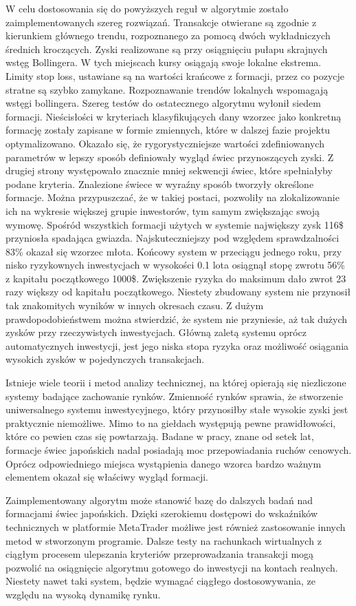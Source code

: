 \documentclass[pdflatex,11pt]{aghdpl}
\begin{document}
W celu dostosowania się do powyższych reguł w algorytmie zostało zaimplementowanych szereg rozwiązań. Transakcje otwierane są zgodnie z kierunkiem głównego trendu, rozpoznanego za pomocą dwóch wykładniczych średnich kroczących. Zyski realizowane są przy osiągnięciu pułapu skrajnych wstęg Bollingera. W tych miejscach kursy osiągają swoje lokalne ekstrema. Limity stop loss, ustawiane są na wartości krańcowe z formacji, przez co pozycje stratne są szybko zamykane. Rozpoznawanie trendów lokalnych wspomagają wstęgi bollingera. Szereg testów do ostatecznego algorytmu wyłonił siedem formacji. Nieścisłości w kryteriach klasyfikujących dany wzorzec jako konkretną formację zostały zapisane w formie zmiennych, które w dalszej fazie projektu optymalizowano. Okazało się, że rygorystyczniejsze wartości zdefiniowanych parametrów w lepszy sposób definiowały wygląd świec przynoszących zyski. Z drugiej strony występowało znacznie mniej sekwencji świec, które spełniałyby podane kryteria. Znalezione świece w wyraźny sposób tworzyły określone formacje. Można przypuszczać, że w takiej postaci, pozwoliły na zlokalizowanie ich na wykresie większej grupie inwestorów, tym samym zwiększając swoją wymowę. Spośród wszystkich formacji użytych w systemie największy zysk 116\$ przyniosła spadająca gwiazda. Najskuteczniejszy pod względem sprawdzalności 83\% okazał się wzorzec młota. Końcowy system w przeciągu jednego roku, przy nisko ryzykownych inwestycjach w wysokości 0.1 lota osiągnął stopę zwrotu 56\% z kapitału początkowego 1000\$. Zwiększenie ryzyka do maksimum dało zwrot 23 razy większy od kapitału początkowego. Niestety zbudowany system nie przynosił tak znakomitych wyników w innych okresach czasu. Z dużym prawdopodobieństwem można stwierdzić, że system nie przyniesie, aż tak dużych zysków przy rzeczywistych inwestycjach. Główną zaletą systemu oprócz automatycznych inwestycji, jest jego niska stopa ryzyka oraz możliwość osiągania wysokich zysków w pojedynczych transakcjach. 

Istnieje wiele teorii i metod analizy technicznej, na której opierają się niezliczone systemy badające zachowanie rynków. Zmienność rynków sprawia, że stworzenie uniwersalnego systemu inwestycyjnego, który przynosiłby stałe wysokie zyski jest praktycznie niemożliwe. Mimo to na giełdach występują pewne prawidłowości, które co pewien czas się powtarzają. Badane w pracy, znane od setek lat, formacje świec japońskich nadal posiadają moc przepowiadania ruchów cenowych. Oprócz odpowiedniego miejsca wystąpienia danego wzorca bardzo ważnym elementem okazał się właściwy wygląd formacji. 

Zaimplementowany algorytm może stanowić bazę do dalszych badań nad formacjami świec japońskich. Dzięki szerokiemu dostępowi do wskaźników technicznych w platformie MetaTrader możliwe jest również zastosowanie innych metod w stworzonym programie. Dalsze testy na rachunkach wirtualnych z ciągłym procesem ulepszania kryteriów przeprowadzania transakcji mogą pozwolić na osiągnięcie algorytmu gotowego do inwestycji na kontach realnych. Niestety nawet taki system, będzie wymagać ciągłego dostosowywania, ze względu na wysoką dynamikę rynku.
% 
% 


\nocite{*}

\end{document}
